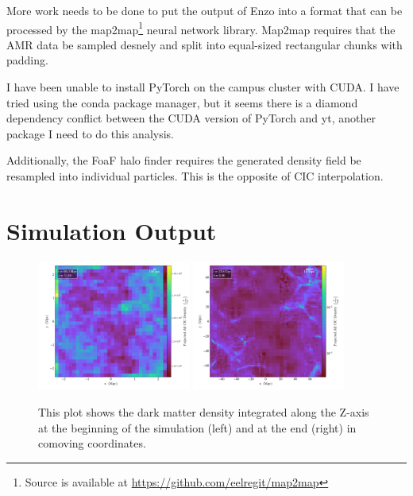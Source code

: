 More work needs to be done to put the output of Enzo into a format that can be processed by the map2map\footnote{Source is available at \url{https://github.com/eelregit/map2map}} neural network library. Map2map requires that the AMR data be sampled desnely and split into equal-sized rectangular chunks with padding. 

I have been unable to install PyTorch on the campus cluster with CUDA. I have tried using the conda package manager, but it seems there is a diamond dependency conflict between the CUDA version of PyTorch and yt, another package I need to do this analysis.

Additionally, the FoaF halo finder requires the generated density field be resampled into individual particles. This is the opposite of CIC interpolation.


\section{Simulation Output}

\begin{figure}[h!]
  \includegraphics[width=0.45\textwidth]{../../presentation/assets/sim-0.png}
  \includegraphics[width=0.45\textwidth]{../../presentation/assets/sim-1.png}
  \label{cosmology-result}
  \caption{This plot shows the dark matter density integrated along the Z-axis at the beginning of the simulation (left) and at the end (right) in comoving coordinates.}
\end{figure}

